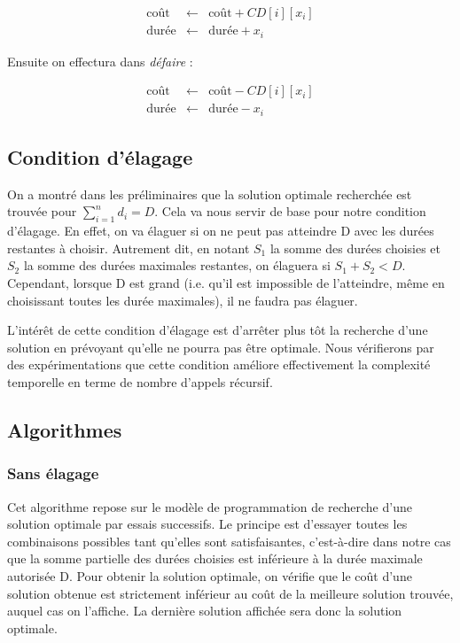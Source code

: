 \documentclass[a4paper, titlepage]{article}
\begin{document}
			\begin{eqnarray*}
				\mbox{coût}  & \leftarrow & \mbox{coût} + CD[i][x_{i}] \\
				\mbox{durée} & \leftarrow & \mbox{durée} + x_{i}
			\end{eqnarray*}

		Ensuite on effectura dans \emph{défaire} :

			\begin{eqnarray*}
				\mbox{coût}  & \leftarrow & \mbox{coût} - CD[i][x_{i}] \\
				\mbox{durée} & \leftarrow & \mbox{durée} - x_{i}
			\end{eqnarray*}


	\subsection{Condition d'élagage}
	On a montré dans les préliminaires que la solution optimale recherchée est trouvée pour $\sum_{i=1}^{n} d_i = D$.
	Cela va nous servir de base pour notre condition d'élagage.
	En effet, on va élaguer si on ne peut pas atteindre D avec les durées restantes à choisir.
	Autrement dit, en notant $S_1$ la somme des durées choisies et $S_2$ la somme des durées maximales restantes, on élaguera si $S_1 + S_2 < D$.
	Cependant, lorsque D est grand (i.e. qu'il est impossible de l'atteindre, même en choisissant toutes les durée maximales), il ne faudra pas élaguer.

	L'intérêt de cette condition d'élagage est d'arrêter plus tôt la recherche d'une solution en prévoyant qu'elle ne pourra pas être optimale.
	Nous vérifierons par des expérimentations que cette condition améliore effectivement la complexité temporelle en terme de nombre d'appels récursif.

	\subsection{Algorithmes}

		\subsubsection{Sans élagage}

			Cet algorithme repose sur le modèle de programmation de recherche d'une solution optimale par essais successifs.
			Le principe est d'essayer toutes les combinaisons possibles tant qu'elles sont satisfaisantes, c'est-à-dire dans notre cas que la somme partielle des durées choisies est inférieure à la durée maximale autorisée D.
			Pour obtenir la solution optimale, on vérifie que le coût d'une solution obtenue est strictement inférieur au coût de la meilleure solution trouvée, auquel cas on l'affiche.
			La dernière solution affichée sera donc la solution optimale.
\end{document}
